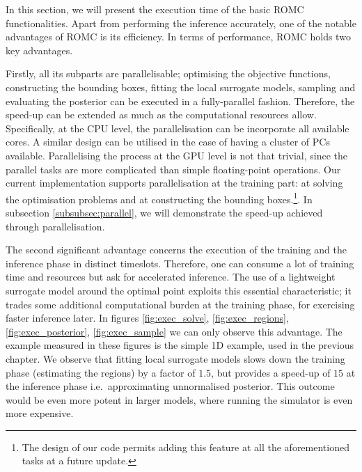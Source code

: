 In this section, we will present the execution time of the basic ROMC
functionalities. Apart from performing the inference accurately, one
of the notable advantages of ROMC is its efficiency. In terms of
performance, ROMC holds two key advantages.

Firstly, all its subparts are parallelisable; optimising the objective
functions, constructing the bounding boxes, fitting the local
surrogate models, sampling and evaluating the posterior can be
executed in a fully-parallel fashion. Therefore, the speed-up can be
extended as much as the computational resources allow. Specifically,
at the CPU level, the parallelisation can be incorporate all available
cores. A similar design can be utilised in the case of having a
cluster of PCs available. Parallelising the process at the GPU level
is not that trivial, since the parallel tasks are more complicated
than simple floating-point operations. Our current implementation
supports parallelisation at the training part: at solving the
optimisation problems and at constructing the bounding
boxes.\footnote{The design of our code permits adding this feature at
  all the aforementioned tasks at a future update.}. In subsection
\ref{subsubsec:parallel}, we will demonstrate the speed-up achieved
through parallelisation.

The second significant advantage concerns the execution of the
training and the inference phase in distinct timeslots. Therefore, one
can consume a lot of training time and resources but ask for
accelerated inference. The use of a lightweight surrogate model around
the optimal point exploits this essential characteristic; it trades
some additional computational burden at the training phase, for
exercising faster inference later. In figures \ref{fig:exec_solve},
\ref{fig:exec_regions}, \ref{fig:exec_posterior},
\ref{fig:exec_sample} we can only observe this advantage. The
example measured in these figures is the simple 1D example, used in
the previous chapter. We observe that fitting local surrogate models
slows down the training phase (estimating the regions) by a factor of
$1.5$, but provides a speed-up of $15$ at the inference phase i.e.\
approximating unnormalised posterior. This outcome would be even more
potent in larger models, where running the simulator is even more
expensive.


